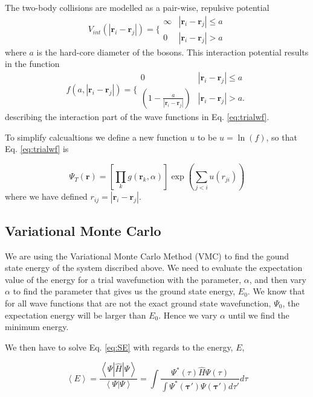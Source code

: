 The two-body collisions are modelled as a pair-wise, repulsive potential 
 \begin{equation}
 V_{int}(|\mathbf{r}_i-\mathbf{r}_j|) =  \Bigg\{
 \begin{array}{ll}
	 \infty & {|\mathbf{r}_i-\mathbf{r}_j|} \leq {a}\\
	 0 & {|\mathbf{r}_i-\mathbf{r}_j|} > {a}
 \end{array}
 \end{equation}
where $a$ is the hard-core diameter of the bosons. This interaction potential results in the function
 \begin{equation}\label{eq:interaction_term}
    f(a,|\mathbf{r}_i-\mathbf{r}_j|)=\Bigg\{
 \begin{array}{ll}
	 0 & {|\mathbf{r}_i-\mathbf{r}_j|} \leq {a}\\
	 (1-\frac{a}{|\mathbf{r}_i-\mathbf{r}_j|}) & {|\mathbf{r}_i-\mathbf{r}_j|} > {a}.
 \end{array}
 \end{equation}
 describing the interaction part of the wave functions in Eq. \ref{eq:trialwf}.
 
 To simplify calcualtions we define a new function $u$ to be $u = \ln(f)$, so that Eq. \ref{eq:trialwf} is 
 
 \begin{equation*}
\Psi_T(\mathbf{r})=\left[
    \prod_k g(\mathbf{r}_k, \alpha)
\right]
\exp{\left(\sum_{j<i}u(r_{ji})\right)}
\end{equation*}
where we have defined $r_{ij}=|\mathbf{r}_i-\mathbf{r}_j|$.
 

\subsection{Variational Monte Carlo}

We are using the Variational Monte Carlo Method (VMC) to find the gound state energy of the system discribed above. We need to evaluate the expectation value of the energy for a trial wavefunction with the parameter, $\alpha$, and then vary $\alpha$ to find the parameter that gives us the ground state energy, $E_0$. We know that for all wave functions that are not the exact ground state wavefunction, $\Psi_0$, the expectation energy will be larger than $E_0$. Hence we vary $\alpha$ until we find the minimum energy.

We then have to solve Eq. \ref{eq:SE} with regards to the energy, $E$, 

\begin{equation}\label{eq:expec_value}
\left< E \right> = \frac{\left< \Psi | \hat{H}| \Psi \right>}{\left< \Psi | \Psi \right>} = \int \frac{\Psi^*(\tau) \hat{H} \Psi(\tau)}{\int \Psi^*(\mathbf{\tau}')\Psi(\mathbf{\tau}') d \tau' }d\tau 
\end{equation}


